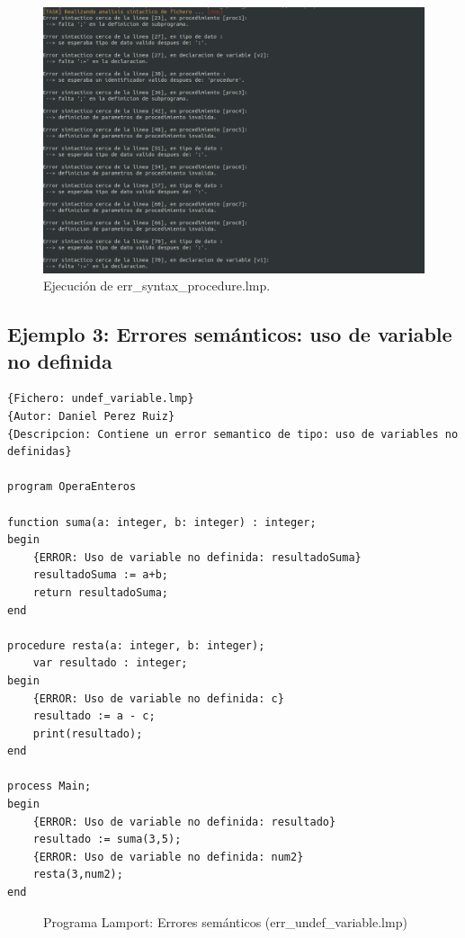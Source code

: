 \newpage
\begin{figure}[h]
    \includegraphics[width=\linewidth]{images/ejemplos/err_syntax/procedures.png}
    \caption{Ejecución de err\_syntax\_procedure.lmp.}
    \label{fig:lamportErrSintaxProcedure_exec}
\end{figure}

\newpage
\subsection{Ejemplo 3: Errores semánticos: uso de variable no definida}
\begin{lstlisting}[style=lamportStyle]
{Fichero: undef_variable.lmp}
{Autor: Daniel Perez Ruiz}
{Descripcion: Contiene un error semantico de tipo: uso de variables no definidas}

program OperaEnteros

function suma(a: integer, b: integer) : integer;
begin
	{ERROR: Uso de variable no definida: resultadoSuma}
	resultadoSuma := a+b;
	return resultadoSuma;
end

procedure resta(a: integer, b: integer);
	var resultado : integer;
begin
	{ERROR: Uso de variable no definida: c}
	resultado := a - c;
	print(resultado);
end

process Main;
begin
	{ERROR: Uso de variable no definida: resultado}
	resultado := suma(3,5);
	{ERROR: Uso de variable no definida: num2}
	resta(3,num2);
end
\end{lstlisting}
\begin{figure}[h]
\caption{Programa Lamport: Errores semánticos (err\_undef\_variable.lmp)}
\label{fig:lamportErrSemanticUndef}
\end{figure}

